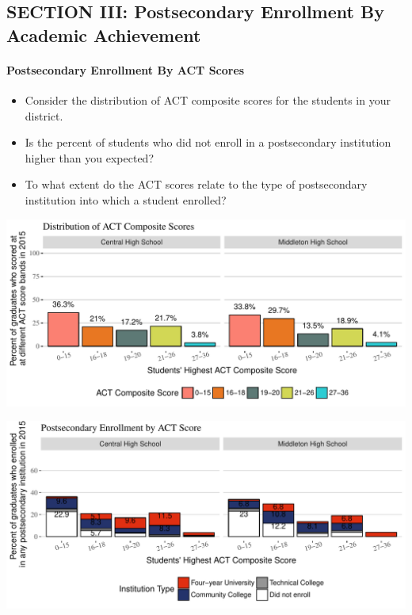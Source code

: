 \documentclass[11pt,]{article}
\providecommand{\tightlist}{%
  \setlength{\itemsep}{0pt}\setlength{\parskip}{0pt}}
\let\oldparagraph\paragraph
\renewcommand{\paragraph}[1]{\oldparagraph{#1}\mbox{}}
\begin{document}
\newpage

\subsection{SECTION III: Postsecondary Enrollment By Academic
Achievement}\label{section-iii-postsecondary-enrollment-by-academic-achievement}

\paragraph{Postsecondary Enrollment By ACT
Scores}\label{postsecondary-enrollment-by-act-scores}

\begin{itemize}
\tightlist
\item
  Consider the distribution of ACT composite scores for the students in
  your district.\\
   
\item
  Is the percent of students who did not enroll in a postsecondary
  institution higher than you expected?
\item
  To what extent do the ACT scores relate to the type of postsecondary
  institution into which a student enrolled?
\end{itemize}

\includegraphics{20170511_PSWRR_files/figure-latex/ACT_distribution-1.pdf}

\includegraphics{20170511_PSWRR_files/figure-latex/Figure7a-1.pdf}
\end{document}
